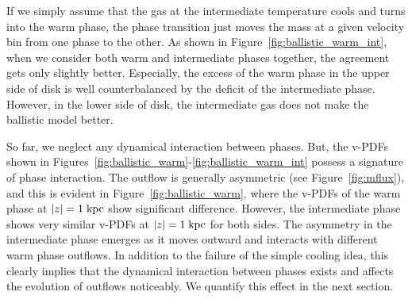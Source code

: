 \documentclass[twocolumn]{aastex62}
\newcommand\kpc{\;{\rm kpc}}
\begin{document}
If we simply assume that the gas at the intermediate temperature cools and turns into the warm phase, the phase transition just moves the mass at a given velocity bin from one phase to the other. As shown in Figure~\ref{fig:ballistic_warm_int}, when we consider both warm and intermediate phases together, the agreement gets only slightly better. Especially, the excess of the warm phase in the upper side of disk is well counterbalanced by the deficit of the intermediate phase. However, in the lower side of disk, the intermediate gas does not make the ballistic model better.

So far, we neglect any dynamical interaction between phases. But, the v-PDFs shown in Figures~\ref{fig:ballistic_warm}-\ref{fig:ballistic_warm_int}  possess a signature of phase interaction. The outflow is generally asymmetric (see Figure~\ref{fig:mflux}), and this is evident in Figure~\ref{fig:ballistic_warm}, where the v-PDFs of the warm phase at $|z|=1\kpc$ show significant difference. However, the intermediate phase shows very similar v-PDFs at $|z|=1\kpc$ for both sides. The asymmetry in the intermediate phase emerges as it moves outward and interacts with different warm phase outflows. In addition to the failure of the simple cooling idea, this clearly implies that the dynamical interaction between phases exists and affects the evolution of outflows noticeably. We quantify this effect in the next section.

\end{document}
